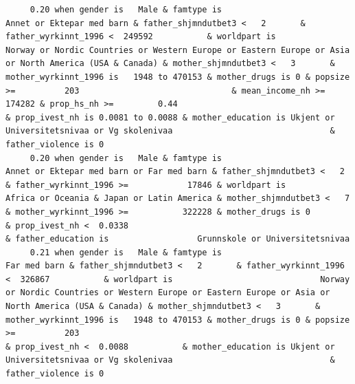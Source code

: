 \documentclass[
  letterpaper,
  DIV=11,
  numbers=noendperiod]{scrreprt}
\begin{document}
\begin{verbatim}
     0.20 when gender is   Male & famtype is                                        Annet or Ektepar med barn & father_shjmndutbet3 <   2       & father_wyrkinnt_1996 <  249592           & worldpart is                              Norway or Nordic Countries or Western Europe or Eastern Europe or Asia or North America (USA & Canada) & mother_shjmndutbet3 <   3       & mother_wyrkinnt_1996 is   1948 to 470153 & mother_drugs is 0 & popsize >=          203                               & mean_income_nh >=           174282 & prop_hs_nh >=         0.44                                    & prop_ivest_nh is 0.0081 to 0.0088 & mother_education is Ukjent or Universitetsnivaa or Vg skolenivaa                                & father_violence is 0                                                                                                               
     0.20 when gender is   Male & famtype is                        Annet or Ektepar med barn or Far med barn & father_shjmndutbet3 <   2       & father_wyrkinnt_1996 >=            17846 & worldpart is                                                                                          Africa or Oceania & Japan or Latin America & mother_shjmndutbet3 <   7       & mother_wyrkinnt_1996 >=           322228 & mother_drugs is 0                                                                                                                                                              & prop_ivest_nh <  0.0338                                                                                                                                                        & father_education is                  Grunnskole or Universitetsnivaa                    
     0.21 when gender is   Male & famtype is                                                     Far med barn & father_shjmndutbet3 <   2       & father_wyrkinnt_1996 <  326867           & worldpart is                              Norway or Nordic Countries or Western Europe or Eastern Europe or Asia or North America (USA & Canada) & mother_shjmndutbet3 <   3       & mother_wyrkinnt_1996 is   1948 to 470153 & mother_drugs is 0 & popsize >=          203                                                                                                                                    & prop_ivest_nh <  0.0088           & mother_education is Ukjent or Universitetsnivaa or Vg skolenivaa                                & father_violence is 0                                                                                                               

\end{verbatim}
\end{document}
